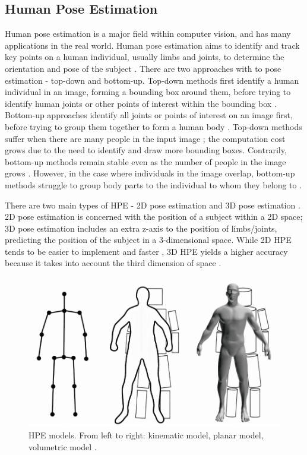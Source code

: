 \documentclass[a4paper, oneside, 11pt]{article}
\begin{document}
\subsection{Human Pose Estimation}

Human pose estimation is a major field within computer vision, and has many applications in the real world. Human pose estimation aims to identify and track key points on a human individual, usually limbs and joints, to determine the orientation and pose of the subject \cite{DefineHumanPoseEstimation}. There are two approaches with to pose estimation - top-down and bottom-up. Top-down methods first identify a human individual in an image, forming a bounding box around them, before trying to identify human joints or other points of interest within the bounding box \cite{HPEVisoAI} \cite{HPEDeepLearningMethods}. Bottom-up approaches identify all joints or points of interest on an image first, before trying to group them together to form a human body \cite{HPEDeepLearningMethods}. Top-down methods suffer when there are many people in the input image \cite{HPEDeepLearningMethods}; the computation cost grows due to the need to identify and draw more bounding boxes. Contrarily, bottom-up methods remain stable even as the number of people in the image grows \cite{HPEDeepLearningMethods}. However, in the case where individuals in the image overlap, bottom-up methods struggle to group body parts to the individual to whom they belong to \cite{HPEDeepLearningMethods}. 

There are two main types of HPE - 2D pose estimation and 3D pose estimation \cite{HumanPose2dvs3d}. 2D pose estimation is concerned with the position of a subject within a 2D space; 3D pose estimation includes an extra z-axis to the position of limbs/joints, predicting the position of the subject in a 3-dimensional space. While 2D HPE tends to be easier to implement and faster \cite{HPEFitnessRehab} \cite{HumanPose2dvs3d}, 3D HPE yields a higher accuracy because it takes into account the third dimension of space \cite{HPEFitnessRehab}.

\begin{figure}[ht]
    \centering
    \includegraphics[scale = 0.26]{img/humanbodymodels.png}
    \caption{HPE models. From left to right: kinematic model, planar model, volumetric model \cite{HPEDeepLearningMethods}.}
    \label{fig:humanbodymodels}
\end{figure}
\end{document}
